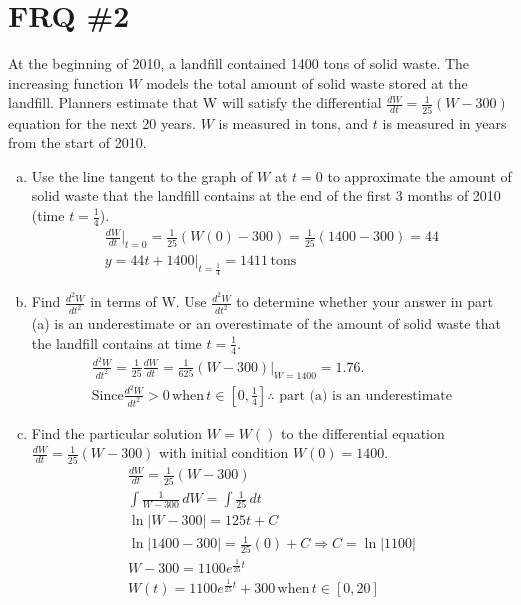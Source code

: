 \documentclass[11pt,letterpaper]{article}
\begin{document}
\section*{FRQ \#2}
At the beginning of 2010, a landfill contained 1400 tons of solid waste. The increasing function $W$ models
the total amount of solid waste stored at the landfill. Planners estimate that W will satisfy the differential $\frac{dW}{dt}=\frac{1}{25}(W-300)$ equation  for the next 20 years. $W$ is measured in tons, and $t$ is measured in years from the start of 2010. 
\begin{enumerate}[a.)]
    \item Use the line tangent to the graph of $W$ at $t = 0$ to approximate the amount of solid waste that the landfill contains at the end of the first 3 months of 2010 (time $t=\frac{1}{4}$). 
    \begin{align*}
        \frac{dW}{dt}\biggr\rvert_{t=0} = \frac{1}{25}(W(0)-300)=\frac{1}{25}(1400-300)=44\\
        y=44t+1400\biggr\rvert_{t=\frac{1}{4}} = 1411 \, \text{tons}
    \end{align*}
    \item Find $\frac{d^2W}{dt^2}$ in terms of W.  Use $\frac{d^2W}{dt^2}$ to determine whether your answer in part (a) is an underestimate or an overestimate of the amount of solid waste that the landfill contains at time $t=\frac{1}{4}$.
    \begin{align*}
        \frac{d^2W}{dt^2}=\frac{1}{25}\frac{dW}{dt}=\frac{1}{625}(W-300)\biggr\rvert_{W=1400} =1.76.\\
        \text{Since} \frac{d^2W}{dt^2}>0 \, \text{when}\, t\in[0,\frac{1}{4}] \therefore \text{ part (a) is an underestimate}   
    \end{align*}
    \item Find the particular solution $W= W()$ to the differential equation $\frac{dW}{dt}=\frac{1}{25}(W-300)$ with initial condition $W(0)=1400$.
    \begin{align*}
        \frac{dW}{dt}=\frac{1}{25}(W-300) \\
        \int \frac{1}{W-300}\,dW= \int \frac{1}{25}\, dt \\
        \ln |W-300|={1}{25}t+C\\
        \ln|1400-300|=\frac{1}{25}(0)+C \Rightarrow C= \ln|1100|\\
        W-300=1100e^{\frac{1}{25}t}\\
        W(t)=1100e^{\frac{1}{25}t}+300 \, \text{when}\, t \in[0,20]
    \end{align*}
\end{enumerate}
\end{document}
